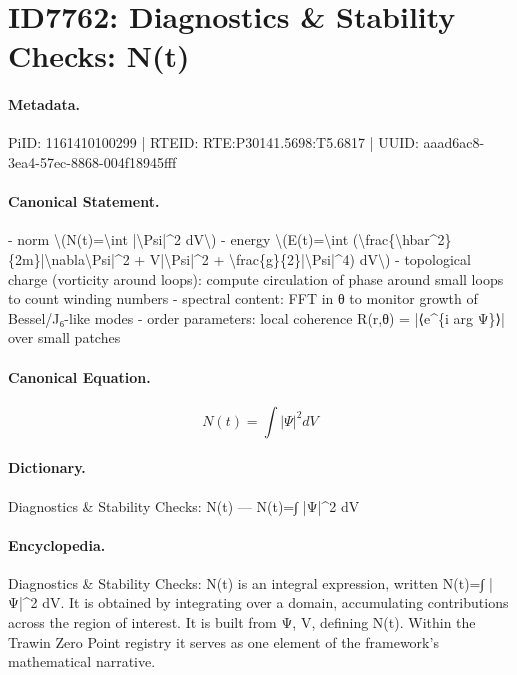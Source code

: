 \section*{ID7762: Diagnostics \& Stability Checks: N(t)}
\paragraph{Metadata.}
PiID: 1161410100299 | RTEID: RTE:P30141.5698:T5.6817 | UUID: aaad6ac8-3ea4-57ec-8868-004f18945fff

\paragraph{Canonical Statement.}
- norm \textbackslash{}(N(t)=\textbackslash{}int |\textbackslash{}Psi|\textasciicircum{}2 dV\textbackslash{}) - energy \textbackslash{}(E(t)=\textbackslash{}int (\textbackslash{}frac\{\textbackslash{}hbar\textasciicircum{}2\}\{2m\}|\textbackslash{}nabla\textbackslash{}Psi|\textasciicircum{}2 + V|\textbackslash{}Psi|\textasciicircum{}2 + \textbackslash{}frac\{g\}\{2\}|\textbackslash{}Psi|\textasciicircum{}4) dV\textbackslash{}) - topological charge (vorticity around loops): compute circulation of phase around small loops to count winding numbers - spectral content: FFT in θ to monitor growth of Bessel/J₆-like modes - order parameters: local coherence R(r,θ) = |⟨e\textasciicircum{}\{i arg Ψ\}⟩| over small patches

\paragraph{Canonical Equation.}
\[
N(t)=\int |\Psi|^2 dV
\]

\paragraph{Dictionary.}
Diagnostics \& Stability Checks: N(t) — N(t)=∫ |Ψ|\textasciicircum{}2 dV

\paragraph{Encyclopedia.}
Diagnostics \& Stability Checks: N(t) is an integral expression, written N(t)=∫ |Ψ|\textasciicircum{}2 dV. It is obtained by integrating over a domain, accumulating contributions across the region of interest. It is built from Ψ, V, defining N(t). Within the Trawin Zero Point registry it serves as one element of the framework's mathematical narrative.
